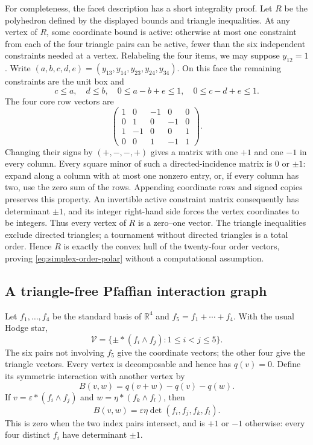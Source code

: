 For completeness, the facet description has a short integrality proof.
Let $R$ be the polyhedron defined by the displayed bounds and triangle
inequalities. At any vertex of $R$, some coordinate bound is active:
otherwise at most one constraint from each of the four triangle pairs can
be active, fewer than the six independent constraints needed at a vertex.
Relabeling the four items, we may suppose $y_{12}=1$. Write
$(a,b,c,d,e)=(y_{13},y_{14},y_{23},y_{24},y_{34})$.
On this face the remaining constraints are the unit box and
\[
 c\le a,\quad d\le b,\quad
 0\le a-b+e\le1,\quad 0\le c-d+e\le1.
\]
The four core row vectors are
\[
 \begin{pmatrix}
 1&0&-1&0&0\\
 0&1&0&-1&0\\
 1&-1&0&0&1\\
 0&0&1&-1&1
 \end{pmatrix}.
\]
Changing their signs by $(+,-,-,+)$ gives a matrix with one $+1$ and one
$-1$ in every column. Every square minor of such a directed-incidence
matrix is $0$ or $\pm1$: expand along a column with at most one nonzero
entry, or, if every column has two, use the zero sum of the rows.
Appending coordinate rows and signed copies preserves this property.
An invertible active constraint matrix consequently has determinant
$\pm1$, and its integer right-hand side forces the vertex coordinates
to be integers. Thus every vertex of $R$ is a zero--one vector. The
triangle inequalities exclude directed triangles; a tournament without
directed triangles is a total order. Hence $R$ is exactly the convex
hull of the twenty-four order vectors, proving
\eqref{eq:simplex-order-polar} without a computational assumption.

\subsection{A triangle-free Pfaffian interaction graph}

Let $f_1,\ldots,f_4$ be the standard basis of $\mathbb R^4$ and
$f_5=f_1+\cdots+f_4$. With the usual Hodge star,
\[
 \mathcal V=\{\pm*(f_i\wedge f_j):1\le i<j\le5\}.
\]
The six pairs not involving $f_5$ give the coordinate vectors; the other
four give the triangle vectors. Every vertex is decomposable and hence
has $q(v)=0$. Define its symmetric interaction with another vertex by
\[
 B(v,w)=q(v+w)-q(v)-q(w).
\]
If $v=\varepsilon*(f_i\wedge f_j)$ and
$w=\eta*(f_k\wedge f_l)$, then
\[
 B(v,w)=\varepsilon\eta\det(f_i,f_j,f_k,f_l).
\]
This is zero when the two index pairs intersect, and is $+1$ or $-1$
otherwise: every four distinct $f_i$ have determinant $\pm1$.


